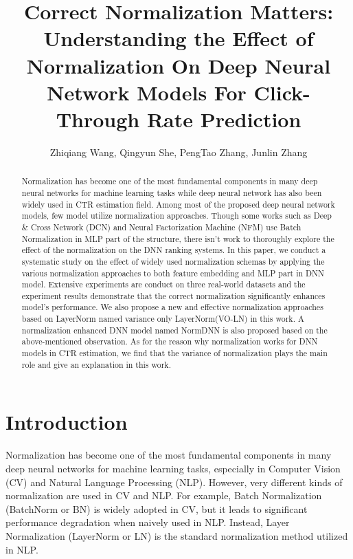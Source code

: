 \documentclass[sigconf]{acmart}
\begin{document}
\title{Correct Normalization Matters: Understanding the Effect of Normalization On Deep Neural Network Models For Click-Through Rate Prediction}

\author{Zhiqiang Wang, Qingyun She, PengTao Zhang, Junlin Zhang}








\renewcommand{\shortauthors}{}

\begin{abstract}
  Normalization has become one of the most fundamental components in many deep neural networks for machine learning tasks while deep neural network has also been widely used in CTR estimation field. Among most of the proposed deep neural network models, few model utilize normalization approaches. Though some works such as Deep \& Cross Network (DCN) and Neural Factorization Machine (NFM) use Batch Normalization in MLP part of the structure, there isn't work to thoroughly explore the effect of the normalization on the DNN ranking systems. In this paper, we conduct a systematic study on the effect of widely used normalization schemas by applying the various normalization approaches to both feature embedding and MLP part in DNN model. Extensive experiments are conduct on three real-world datasets and the experiment results demonstrate that the correct normalization significantly enhances model's performance. We also propose a new and effective normalization approaches based on LayerNorm named variance only LayerNorm(VO-LN) in this work. A normalization enhanced DNN model named NormDNN is also proposed based on the above-mentioned observation. As for the reason why normalization works for DNN models in CTR estimation, we find that the variance of normalization plays the main role and give an explanation in this work.
\end{abstract}








\maketitle

\section{Introduction}
Normalization has become one of the most fundamental components in many deep neural networks for machine learning tasks, especially in Computer Vision (CV) and Natural Language Processing (NLP). However, very different kinds of normalization are used in CV and NLP. For example, Batch Normalization (BatchNorm or BN) \cite{ioffe2015batch} is widely adopted in CV, but it leads to significant performance degradation when naively used in NLP. Instead, Layer Normalization (LayerNorm or LN) \cite{ba2016layer} is the standard normalization method utilized in NLP.
\end{document}
